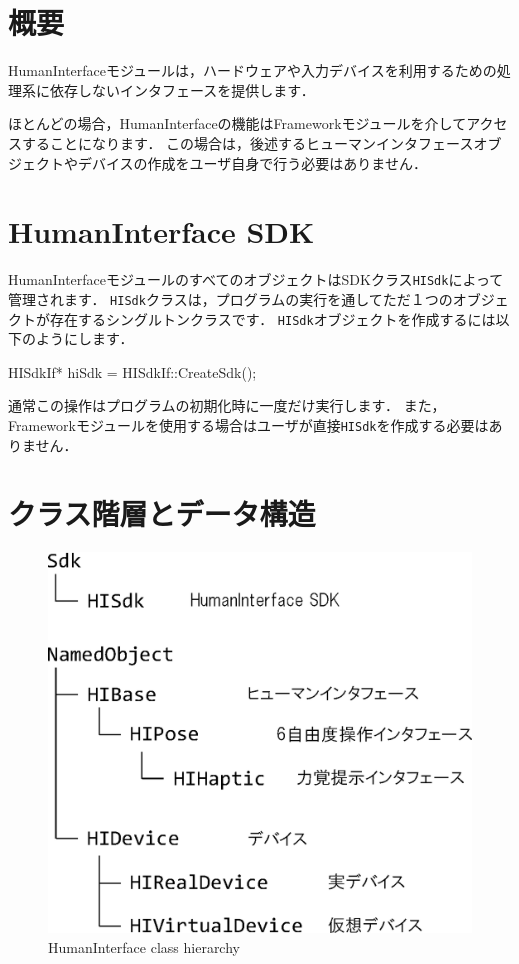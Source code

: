 \section{概要}

HumanInterfaceモジュールは，ハードウェアや入力デバイスを利用するための処理系に依存しないインタフェースを提供します．

\KLUDGE ほとんどの場合，HumanInterfaceの機能はFrameworkモジュールを介してアクセスすることになります．
\KLUDGE この場合は，後述するヒューマンインタフェースオブジェクトやデバイスの作成をユーザ自身で行う必要はありません．

\section{HumanInterface SDK}

HumanInterfaceモジュールのすべてのオブジェクトはSDKクラス\texttt{HISdk}によって管理されます．
\texttt{HISdk}クラスは，プログラムの実行を通してただ１つのオブジェクトが存在するシングルトンクラスです．
\texttt{HISdk}オブジェクトを作成するには以下のようにします．
\begin{sourcecode}
HISdkIf* hiSdk = HISdkIf::CreateSdk();
\end{sourcecode}
\KLUDGE 通常この操作はプログラムの初期化時に一度だけ実行します．
\KLUDGE また，Frameworkモジュールを使用する場合はユーザが直接\texttt{HISdk}を作成する必要はありません．

\section{クラス階層とデータ構造}

\begin{figure}[t]
\begin{center}
\includegraphics[width=.5\hsize]{fig/hiclass.eps}
\end{center}
\caption{HumanInterface class hierarchy}
\label{fig_hiclass}
\end{figure}

